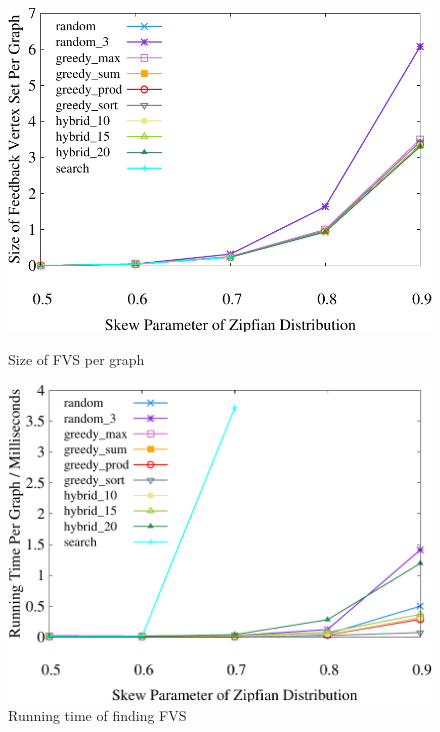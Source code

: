 
\begin{figure}[t]
    \centering
    \begin{minipage}[b]{0.47\linewidth}
        \centering
        \includegraphics[width=\textwidth]{./exp_fig/fvs/fvs}
        \caption{Size of FVS per graph}
        \label{fig:fvs:fvs}
    \end{minipage}
\quad
    \begin{minipage}[b]{0.48\linewidth}
        \centering
        \includegraphics[width=\textwidth]{./exp_fig/fvs/latency}
        \caption{Running time of finding FVS}
        \label{fig:fvs:latency}
    \end{minipage}
\end{figure}


